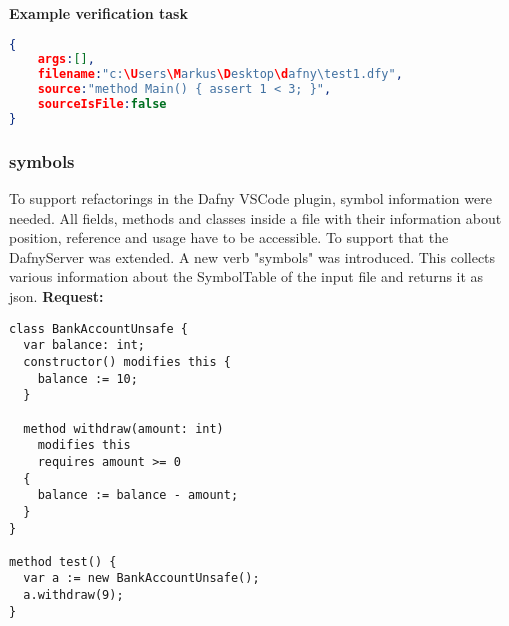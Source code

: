 \textbf{Example verification task}
\begin{lstlisting}[language=json,firstnumber=1]
{
	args:[],
	filename:"c:\Users\Markus\Desktop\dafny\test1.dfy",
	source:"method Main() {	assert 1 < 3; }",
	sourceIsFile:false
}

\end{lstlisting}

\subsubsection{symbols}
To support refactorings in the Dafny VSCode plugin, symbol information were needed. All fields, methods and classes inside a file with their information about position, reference and usage have to be accessible. To support that the DafnyServer was extended. A new verb "symbols" was introduced. This collects various information about the SymbolTable of the input file and returns it as json. 
\newline\newline
\textbf{Request: }

\begin{lstlisting}[language=dafny]
class BankAccountUnsafe {
  var balance: int;
  constructor() modifies this { 
    balance := 10;
  }
  
  method withdraw(amount: int) 
    modifies this
    requires amount >= 0
  {   
    balance := balance - amount; 
  } 
}   

method test() { 
  var a := new BankAccountUnsafe(); 
  a.withdraw(9);  
}   
\end{lstlisting}

